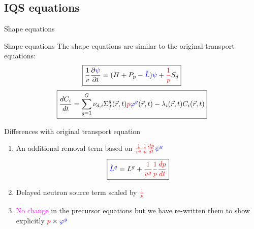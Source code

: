 \documentclass[8pt]{beamer}
\renewcommand{\div}{\vec{\nabla}\! \cdot \!}
\newcommand{\grad}{\vec{\nabla}}
\newcommand{\be}{\begin{equation}}
\newcommand{\ee}{\end{equation}}
\newcommand{\ben}{\begin{enumerate}}
\newcommand{\een}{\end{enumerate}}
\newcommand{\keff}{\ensuremath{k_{\textit{eff}}}}
\newcommand{\tcr}[1]{\textcolor{red}{#1}}
\newcommand{\tcb}[1]{\textcolor{blue}{#1}}
\newcommand{\tcm}[1]{\textcolor{magenta}{#1}}
\begin{document}
\subsection{IQS equations}

\begin{frame}{Shape equations}

\begin{block}{Shape equations}
The shape equations are similar to the original transport equations:
\begin{equation*}
\boxed{
\frac{1}{v}\frac{\partial \tcb{\psi} }{\partial t} = (H + P_p - \tcb{\tilde{L}}) \tcb{\psi}  + \tcr{\frac{1}{p}} S_{d} 
}
\end{equation*}
\begin{equation*}
\boxed{
\frac{dC_i}{dt} = \sum_{g=1}^G \nu_{d,i} \Sigma_f^g(\vec{r},t) \tcr{p} \tcb{\varphi^{g}}(\vec{r},t) - \lambda_i(\vec{r},t) C_i(\vec{r},t) 
}
\end{equation*}
\end{block}

\begin{block}{Differences with original transport equation}
\ben
\item An additional removal term based on $\tcr{\frac{1}{v^g}\frac{1}{p}\frac{dp}{dt}} \tcb{\psi^g}$
\vspace{-3mm}
\begin{equation*}
\boxed{
\tcb{\tilde{L}^g} = L^g + \tcr{\frac{1}{v^g}\frac{1}{p}\frac{dp}{dt}} 
}
\end{equation*}
\vspace{-3mm}
\item Delayed neutron source term scaled by $\tcr{\frac{1}{p}}$
\item \tcm{No change} in the precursor equations but we have re-written them to show explicitly  $\tcr{p} \times \tcb{\varphi^{g}}$
\een
\end{block}

\end{frame}
\end{document}
